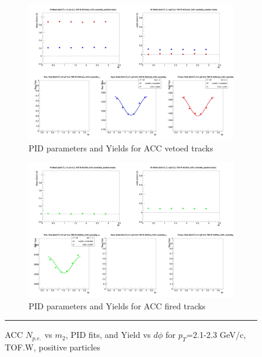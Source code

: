 \begin{figure}[H]
  \ContinuedFloat
    \begin{subfigure}{1\textwidth}
    \includegraphics[width=1\textwidth]{hiptfits/pos/fitParams_tof2_cent0_ch1_pT-21-23.jpg}
    \caption{PID parameters and Yields for ACC vetoed tracks}
    \end{subfigure}    
    \begin{subfigure}{1\textwidth}
    \includegraphics[width=1\textwidth]{hiptfits/pos/fitParams_tof3_cent0_ch1_pT-21-23.jpg}
    \caption{PID parameters and Yields for ACC fired tracks}
    \end{subfigure} 
    \rule{35em}{0.5pt}
  \caption[ACC $N_{p.e.}$ vs $m_2$, PID fits, and Yield vs $d\phi$ for $p_T$=2.1-2.3 GeV/c, TOF.W, positive particles]{ACC $N_{p.e.}$ vs $m_2$, PID fits, and Yield vs $d\phi$ for $p_T$=2.1-2.3 GeV/c, TOF.W, positive particles}
  \label{fig:acc21-23pos}
\end{figure}


